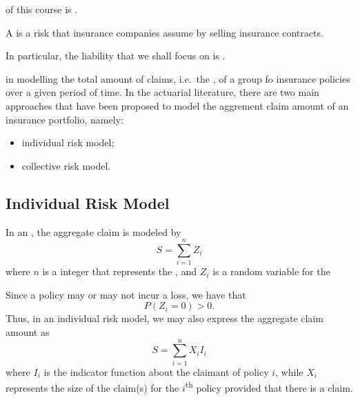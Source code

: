 \documentclass[notoc,notitlepage]{tufte-book}
\begin{document}
 of this course is .

\begin{defn}\label{defn:liability_risk}
  A  is a risk that insurance companies assume by selling insurance contracts.
\end{defn}

In particular, the liability that we shall focus on is .

 in modelling the total amount of claims, i.e.\ the , of a group fo insurance policies over a given period of time. In the actuarial literature, there are two main approaches that have been proposed to model the aggrement claim amount of an insurance portfolio, namely:
\begin{itemize}
  \item individual risk model;
  \item collective risk model.
\end{itemize}

\subsection{Individual Risk Model}%
\label{sub:individual_risk_model}

\begin{defn}\label{defn:individual_risk_model}
  In an , the aggregate claim is modeled by
  \begin{equation*}
    S = \sum_{i=1}^{n} Z_i
  \end{equation*}
  where $n$ is a  integer that represents the , and $Z_i$ is a random variable for the 
\end{defn}

\begin{note}
  Since a policy may or may not incur a loss, we have that
  \begin{equation*}
    P(Z_i = 0) > 0.
  \end{equation*}
  Thus, in an individual risk model, we may also express the aggregate claim amount as
  \begin{equation*}
    S = \sum_{i=1}^{n} X_i I_i
  \end{equation*}
  where $I_i$ is the indicator function about the claimant of policy $i$, while $X_i$ represents the size of the claim(s) for the $i$\textsuperscript{th} policy provided that there is a claim.
\end{note}
\end{document}
